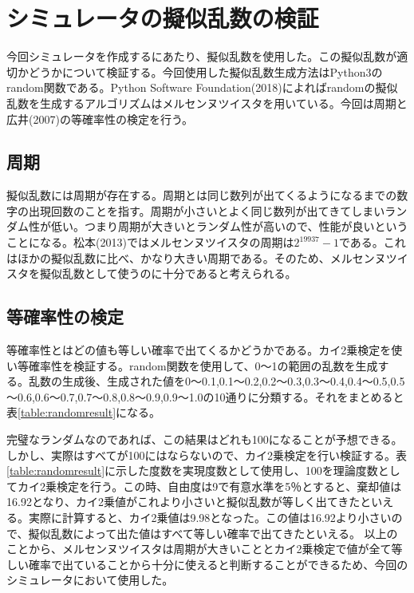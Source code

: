 \section{シミュレータの擬似乱数の検証}
今回シミュレータを作成するにあたり、擬似乱数を使用した。この擬似乱数が適切かどうかについて検証する。今回使用した擬似乱数生成方法はPython3のrandom関数である。Python Software Foundation(2018)によればrandomの擬似乱数を生成するアルゴリズムはメルセンヌツイスタを用いている。今回は周期と広井(2007)の等確率性の検定を行う。
\subsection{周期}
擬似乱数には周期が存在する。周期とは同じ数列が出てくるようになるまでの数字の出現回数のことを指す。周期が小さいとよく同じ数列が出てきてしまいランダム性が低い。つまり周期が大きいとランダム性が高いので、性能が良いということになる。松本(2013)ではメルセンヌツイスタの周期は$2^{19937}-1$である。これはほかの擬似乱数に比べ、かなり大きい周期である。そのため、メルセンヌツイスタを擬似乱数として使うのに十分であると考えられる。
\subsection{等確率性の検定}
等確率性とはどの値も等しい確率で出てくるかどうかである。カイ2乗検定を使い等確率性を検証する。random関数を使用して、0～1の範囲の乱数を生成する。乱数の生成後、生成された値を0～0.1,0.1～0.2,0.2～0.3,0.3～0.4,0.4～0.5,0.5～0.6,0.6～0.7,0.7～0.8,0.8～0.9,0.9～1.0の10通りに分類する。それをまとめると表\ref{table:randomresult}になる。
\begin{table}[H]
 \begin{center}
 \caption{random関数での結果}
 \label{table:randomresult}
 \end{center}
\end{table}
完璧なランダムなのであれば、この結果はどれも100になることが予想できる。しかし、実際はすべてが100にはならないので、カイ2乗検定を行い検証する。表\ref{table:randomresult}に示した度数を実現度数として使用し、100を理論度数としてカイ2乗検定を行う。この時、自由度は9で有意水準を5％とすると、棄却値は16.92となり、カイ2乗値がこれより小さいと擬似乱数が等しく出てきたといえる。実際に計算すると、カイ2乗値は9.98となった。この値は16.92より小さいので、擬似乱数によって出た値はすべて等しい確率で出てきたといえる。
以上のことから、メルセンヌツイスタは周期が大きいこととカイ2乗検定で値が全て等しい確率で出ていることから十分に使えると判断することができるため、今回のシミュレータにおいて使用した。
